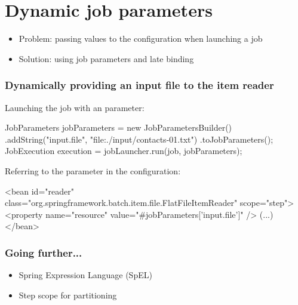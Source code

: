 \section{Dynamic job parameters}

\begin{frame}
 \begin{itemize}
  \item Problem: passing values to the configuration when launching a job
  \item Solution: using job parameters and late binding
 \end{itemize}
\end{frame}

\begin{frame}[fragile]
 \frametitle{Dynamically providing an input file to the item reader}

 Launching the job with an  parameter:
 \begin{javacode}
JobParameters jobParameters = new JobParametersBuilder()
  .addString("input.file", "file:./input/contacts-01.txt")
  .toJobParameters();
JobExecution execution = jobLauncher.run(job, jobParameters);
 \end{javacode}
 Referring to the  parameter in the configuration:
 \begin{xmlcode}
<bean id="reader"
      class="org.springframework.batch.item.file.FlatFileItemReader"
      scope="step">
  <property name="resource" value="#{jobParameters['input.file']}" />
  (...)
</bean>
 \end{xmlcode} 
\end{frame}

\begin{frame}
 \frametitle{Going further...}
 \begin{itemize}
  \item Spring Expression Language (SpEL)
  \item Step scope for partitioning  
 \end{itemize}
\end{frame}

